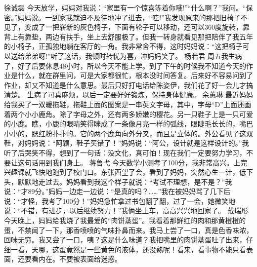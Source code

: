 {}\markdownRendererInterblockSeparator
{}徐诚磊\markdownRendererInterblockSeparator
{}今天放学，妈妈对我说：“家里有一个惊喜等着你哦!”“什么啊？”我问。“保密。”妈妈说。一到家我就迫不及待地冲了进去，“哇!”我发现原来的那把旧椅子不见了，变成了一把崭新的灰色椅子，下面有轮子可以移动，还可以360度旋转，靠背上有靠垫，两边有扶手，坐上去舒服极了。但我一转身就看见那把陪伴了我五年的小椅子，正孤独地躺在客厅的一角。我非常舍不得，这时妈妈说：“这把椅子可以送给弟弟呀!”听了这话，我顿时转忧为喜，冲妈妈笑了。\markdownRendererInterblockSeparator
{}\markdownRendererInterblockSeparator
{}杨若君\markdownRendererInterblockSeparator
{}周五我生病了，好了后要休息48小时，所以今天不能上学。到了下午的时候我不知道今天的作业是什么，就在群里问，可是大家都很忙，根本没时间答复。后来好不容易问到了作业，却又不知道是什么意思。最后只好打电话给陈姿伊，我们花了好一会儿才搞清楚。\markdownRendererInterblockSeparator
{}生病了可真麻烦，以后一定要好好锻炼，保持身体健康。\markdownRendererInterblockSeparator
{}\markdownRendererInterblockSeparator
{}余蕙琳\markdownRendererInterblockSeparator
{}最近妈妈给我买了一双暖拖鞋，拖鞋上面的图案是一串英文字母，其中，字母“D”上面还画着两个小小鹿角。除了字母之外，还有两多娇嫩的樱花。另一只鞋子上是一只可爱的小鹿。瞧，小鹿的眼晴笑得眯成了一条像月亮一样的弧线，眼睫毛长长的，嘴巴小小的，腮红粉扑扑的。它的两个鹿角向外分叉，而且是立体的。外公看见了这双鞋，对妈妈说：“阿颖，鞋子买错了！”妈妈说：“阿公，设计就是这样设计的。”我听了后哭笑不得，想到了一句话：没文化，真可怕！现在我们一定要努力学习，不要让这句话用到我们身上。\markdownRendererInterblockSeparator
{}\markdownRendererInterblockSeparator
{}蒋鲁弋\markdownRendererInterblockSeparator
{}今天数学小测考了100分，我非常高兴。上完兴趣课就飞快地跑到了校门口。东张西望了会，看到了妈妈，突然心生一计，低下头，默默地走过去。妈妈看到我这个样子就说：“考试不理想，是不是？”我说：“才89分。”妈妈一边走一边说：“是真的吗？……”我在被妈妈骂了几下后说：“才怪，我考了100分！”妈妈急忙拿过书包翻了翻，过了一会，她微笑地说：“不错，有进步，以后继续努力！”我俩坐上车，高高兴兴地回家了。\markdownRendererInterblockSeparator
{}\markdownRendererInterblockSeparator
{}戴瑞彤\markdownRendererInterblockSeparator
{}今天晚上，妈妈给我烧了我最爱的“肉饼蒸蛋”。我看着那鲜红的肉和那黄橙橙的蛋，不禁闻了一下，那香喷喷的气味扑鼻而来。我马上尝了一口，真是色香味浓，回味无穷。我又尝了一口，咦？这是什么味道？我把嘴里的肉饼蒸蛋吐了出来，仔细一看，天哪，这蛋竟然是一些黄色的液体，还没熟呢！看来，看事物不能只看表面，还要看内在。不要被表面给迷惑。\markdownRendererInterblockSeparator
